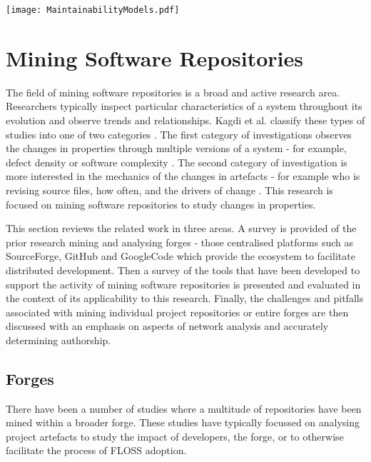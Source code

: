 \begin{table}
\begin{tabular}
\centering 
\texttt{[image: MaintainabilityModels.pdf]}
\label{tab:MaintainabilityModels}
\end{tabular}
\end{table}

\section{Mining Software Repositories} %
The field of mining software repositories is a broad and active research area. Researchers typically inspect particular characteristics of a system throughout its evolution and observe trends and relationships. Kagdi et al. classify these types of studies into one of two categories \citep{kagdi2007survey}. The first category of investigations observes the changes in properties through multiple versions of a system - for example, defect density or software complexity \citep{yamashita2017software, agrawal2018we, tian2018statistical}. The second category of investigation is more interested in the mechanics of the changes in artefacts - for example who is revising source files, how often, and the drivers of change \citep{lee2017understanding, ortu2018mining}. This research is focused on mining software repositories to study changes in properties.

This section reviews the related work in three areas. A survey is provided of the prior research mining and analysing forges - those centralised platforms such as SourceForge, GitHub and GoogleCode which provide the ecosystem to facilitate distributed development. Then a survey of the tools that have been developed to support the activity of mining software repositories is presented and evaluated in the context of its applicability to this research. Finally, the challenges and pitfalls associated with mining individual project repositories or entire forges are then discussed with an emphasis on aspects of network analysis and accurately determining authorship.

\subsection{Forges}
There have been a number of studies where a multitude of repositories have been mined within a broader forge. These studies have typically focussed on analysing project artefacts to study the impact of developers, the forge, or to otherwise facilitate the process of FLOSS adoption.


